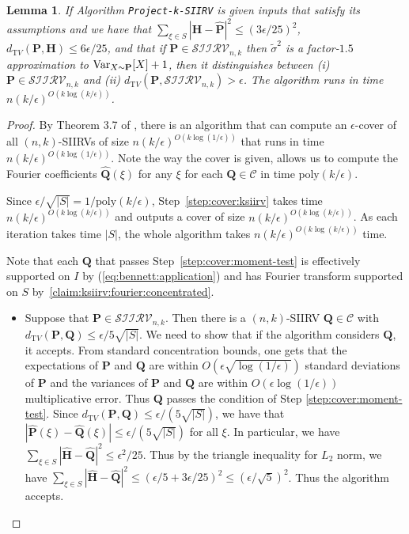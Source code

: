 \documentclass[11pt]{article}
\newtheorem{lemma}[theorem]{Lemma}
\theoremstyle{definition}
\newcommand{\poly}{\mathrm{poly}}
\newcommand{\p}{\mathbf{P}}
\newcommand{\q}{\mathbf{Q}}
\newcommand{\h}{\mathbf{H}}
\newcommand{\dtv}{d_{\mathrm TV}}
\newcommand{\var}{\Var}
\newcommand{\eps}{\epsilon}
\newcommand{\Var}{\mathop{\textnormal{Var}}\nolimits}
\providecommand{\poly}{\operatorname*{poly}}
\newcommand{\classksiirv}[2][n]{\ensuremath{\mathcal{SIIRV}_{#1,#2}}\xspace}
\newcommand{\fourier}[1]{\widehat{#1}}
\begin{document}
\begin{lemma} If Algorithm \texttt{Project-k-SIIRV} is given inputs that satisfy its assumptions and we have that $\sum_{\xi \in S} |\fourier{\h}-\fourier{\p}|^2 \leq (3\eps/25)^2$, $\dtv(\p,\h) \leq 6\eps/25$, and that if $\p\in\classksiirv[n]{k}$ then $\widetilde{\sigma}^2$ is a factor-$1.5$ approximation to $\var_{X \sim \p}[X]+1$, then it distinguishes between (i) $\p\in\classksiirv[n]{k}$ and (ii) $\dtv(\p,\classksiirv[n]{k})>\eps$. The algorithm runs in time $n\left( k/\eps \right)^{O(k\log(k/\epsilon))}$.\end{lemma}
\begin{proof}
By Theorem 3.7 of \cite{DKS:16}, there is an algorithm that can compute an $\eps$-cover of all $(n,k)$-SIIRVs of size $n\left( k/\eps \right)^{O(k\log(1/\epsilon))}$ that runs in time $n\left( k/\eps \right)^{O(k\log(1/\epsilon))}$. Note the way the cover is given, allows us to compute the Fourier coefficients $\fourier{\q}(\xi)$ for any $\xi$ for each $\q \in \mathcal{C}$ in time $\poly(k/\eps)$.

 Since $\eps/\sqrt{|S|}=1/\poly(k/\eps)$, Step~\ref{step:cover:ksiirv} takes time $n\left( k/\eps \right)^{O(k\log(k/\epsilon))}$ and outputs a cover of size $n\left( k/\eps \right)^{O(k\log(k/\epsilon))}$. As each iteration takes time $|S|$, the whole algorithm takes $n\left( k/\eps \right)^{O(k\log(k/\epsilon))}$ time.

Note that each $\q$ that passes Step~\ref{step:cover:moment-test} is effectively supported on $I$ by (\ref{eq:bennett:application}) and has Fourier transform supported on $S$ by~\cref{claim:ksiirv:fourier:concentrated}.

\begin{itemize}
  \item Suppose that $\p\in\classksiirv[n]{k}$. Then there is a $(n,k)$-SIIRV $\q \in \mathcal{C}$ with $\dtv(\p,\q) \leq {\eps}/{5\sqrt{|S|}}$.
We need to show that if the algorithm considers $\q$, it accepts. From standard concentration bounds, one gets that the expectations of $\p$ and $\q$ are within $O(\eps\sqrt{\log(1/\eps)})$ standard deviations of $\p$ and the variances of $\p$ and $\q$ are within $O(\eps\log(1/\eps))$ multiplicative error.
Thus $\q$ passes the condition of Step \ref{step:cover:moment-test}. Since $\dtv(\p,\q) \leq \eps/(5\sqrt{|S|})$, we have that $|\fourier{\p}(\xi)-\fourier{\q}(\xi)| \leq \eps/(5\sqrt{|S|})$ for all $\xi$.
In particular, we have $\sum_{\xi \in S} |\fourier{\h}-\fourier{\q}|^2 \leq \eps^2/25$. Thus by the triangle inequality for $L_2$ norm, we have  $\sum_{\xi \in S} |\fourier{\h}-\fourier{\q}|^2 \leq (\eps/5 + 3\eps/25)^2 \leq (\eps/\sqrt{5})^2$. Thus the algorithm accepts.


\end{itemize}
\end{proof}
\end{document}

